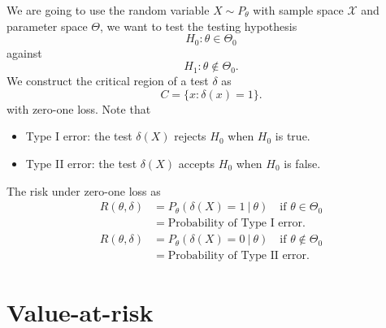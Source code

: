 \begin{example}
    We are going to use the random variable $X \sim P_\theta$ with sample space $\mathcal{X}$ and 
    parameter space $\Theta$, we want to test the testing hypothesis
    \[
        H_0 : \theta \in \Theta_0
    \]
    against 
    \[
        H_1 : \theta \notin \Theta_0.
    \]
    We construct the critical region of a test $\delta$ as  
    \[
        C = \{ x : \delta(x) = 1 \}.
    \]
    with zero-one loss. Note that 
    \begin{itemize}
        \item Type I error: the test $\delta(X)$ rejects $H_0$ when $H_0$ is true.
        \item Type II error: the test $\delta(X)$ accepts $H_0$ when $H_0$ is false.
    \end{itemize}
    
    The risk under zero-one loss as 
    \begin{align*}
        R(\theta, \delta) &= P_\theta (\delta(X) = 1 \> | \> \theta) \quad \text{if } \theta \in \Theta_0\\
        &= \text{Probability of Type I error}.
    \end{align*}
    \begin{align*}
        R(\theta, \delta) &= P_\theta (\delta(X) = 0 \> | \> \theta) \quad \text{if } \theta \notin \Theta_0\\
        &= \text{Probability of Type II error}.
    \end{align*}
\end{example}

\section{Value-at-risk}

